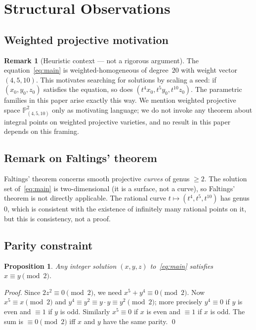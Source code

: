 \documentclass[12pt,a4paper]{article}
\newtheorem{proposition}[theorem]{Proposition}
\theoremstyle{definition}
\newtheorem{remark}[theorem]{Remark}
\begin{document}
\section{Structural Observations}\label{sec:structure}

\subsection{Weighted projective motivation}

\begin{remark}[Heuristic context --- not a rigorous argument]
The equation~\eqref{eq:main} is weighted-homogeneous of degree~$20$ with
weight vector $(4,5,10)$.  This motivates searching for solutions by
scaling a seed: if $(x_0,y_0,z_0)$ satisfies the equation, so does
$(t^4 x_0, t^5 y_0, t^{10} z_0)$.  The parametric families in this paper
arise exactly this way.  We mention weighted projective space
$\mathbb{P}^2_{(4,5,10)}$ only as motivating language; we do not invoke
any theorem about integral points on weighted projective varieties, and no
result in this paper depends on this framing.
\end{remark}

\subsection{Remark on Faltings' theorem}

Faltings' theorem concerns smooth projective \emph{curves} of genus $\geq 2$.
The solution set of~\eqref{eq:main} is two-dimensional (it is a surface, not
a curve), so Faltings' theorem is not directly applicable.  The rational
curve $t \mapsto (t^4, t^5, t^{10})$ has genus~$0$, which is
consistent with the existence of infinitely many rational points on it,
but this is consistency, not a proof.

\subsection{Parity constraint}

\begin{proposition}\label{prop:parity}
  Any integer solution $(x, y, z)$ to~\eqref{eq:main} satisfies $x \equiv y \pmod{2}$.
\end{proposition}

\begin{proof}
  Since $2z^2 \equiv 0 \pmod{2}$, we need $x^5 + y^4 \equiv 0 \pmod{2}$.
  Now $x^5 \equiv x \pmod{2}$ and $y^4 \equiv y^2 \equiv y \cdot y \equiv y^2 \pmod 2$;
  more precisely $y^4 \equiv 0$ if $y$ is even and $\equiv 1$ if $y$ is odd.
  Similarly $x^5 \equiv 0$ if $x$ is even and $\equiv 1$ if $x$ is odd.
  The sum is $\equiv 0 \pmod 2$ iff $x$ and $y$ have the same parity.%
  \qed
\end{proof}
\end{document}
